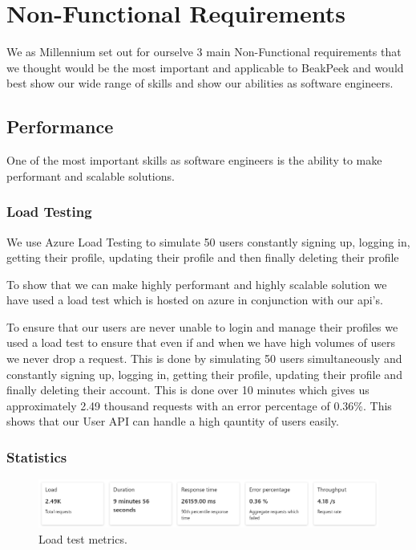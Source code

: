 \documentclass[a4paper]{article}
\begin{document}
\section{Non-Functional Requirements}

We as Millennium set out for ourselve 3 main Non-Functional requirements that we
thought would be the most important and applicable to BeakPeek and would best show 
our wide range of skills and show our abilities as software engineers.

\subsection{Performance}
One of the most important skills as software engineers is the ability to make performant
and scalable solutions. \newline

\subsubsection{Load Testing}
We use Azure Load Testing to simulate 50 users constantly signing up, logging in, 
getting their profile, updating their profile and then finally deleting their profile

To show that we can make highly performant and highly scalable solution we have 
used a load test which is hosted on azure in conjunction with our api's. \newline

To ensure that our users are never unable to login and manage their profiles we 
used a load test to ensure that even if and when we have high volumes of users we 
never drop a request. This is done by simulating 50 users simultaneously and 
constantly signing up, logging in, getting their profile, updating their profile
and finally deleting their account. This is done over 10 minutes which gives us
approximately 2.49 thousand requests with an error percentage of 0.36\%. This 
shows that our User API can handle a high qauntity of users easily.


\subsubsection{Statistics}

\begin{figure}[h]
  \includegraphics[width=\linewidth]{../Assets/load_test_load.png}
  \caption{Load test metrics.}
  \label{fig:load test metrics}
\end{figure}
\end{document}
